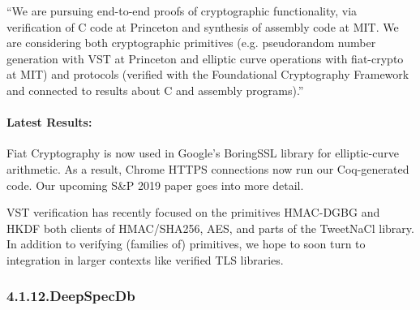 \documentclass[12pt,twoside]{article}
\begin{document}
\noindent{}\textquotedblleft{}We are pursuing end-to-end proofs of cryptographic functionality, via
verification of C code at Princeton and synthesis of assembly code at
MIT.  We are considering both cryptographic primitives
(e.g. pseudorandom number generation with VST at Princeton and
elliptic curve operations with fiat-crypto at MIT) and protocols
(verified with the Foundational Cryptography Framework and connected
to results about C and assembly programs).\textquotedblright{}%

\paragraph{Latest Results:}\label{sec-latest-results-}%

\noindent{}Fiat Cryptography is now used in Google's BoringSSL library for
elliptic-curve arithmetic.  As a result, Chrome HTTPS connections now
run our Coq-generated code.  Our  upcoming S\&P 2019 paper goes into
more detail.%

VST verification has recently focused on the primitives HMAC-DGBG and
HKDF \textendash{} both clients of HMAC/SHA256, AES, and parts of the TweetNaCl
library. In addition to verifying (families of) primitives, we hope to
soon turn to integration in larger contexts like verified TLS
libraries.%

\subsubsection{4.1.12.\hspace*{0.5em}DeepSpecDb}\label{sec-deepspecdb}%
\end{document}
